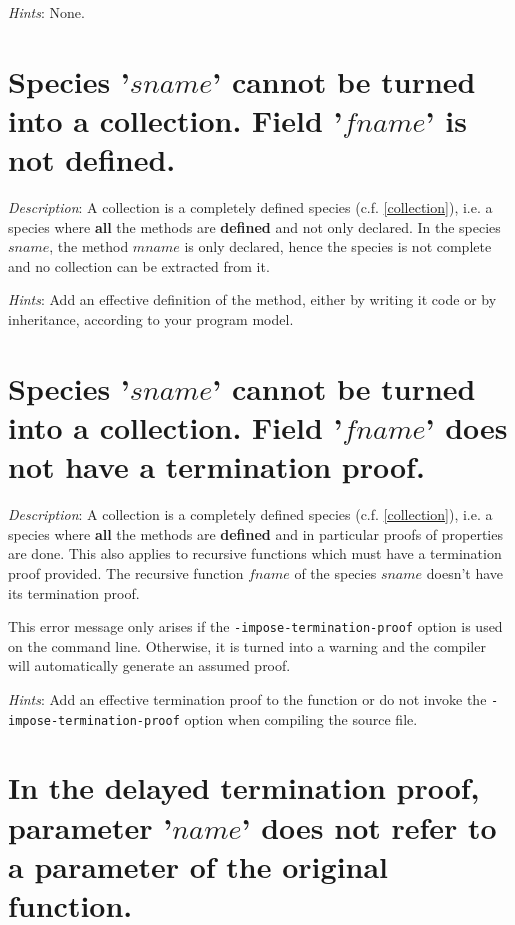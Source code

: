{\em Hints}: None.



\section*{Species '$sname$' cannot be turned into a collection. Field
  '$fname$' is not defined.}

{\em Description}: A collection is a completely defined species
(c.f. \ref{collection}), i.e. a species where {\bf all} the methods
are {\bf defined} and not only declared. In the species $sname$, the
method $mname$ is only declared, hence the species is not complete and
no collection can be extracted from it.

{\em Hints}: Add an effective definition of the method, either by
writing it code or by inheritance, according to your program model.



\section*{Species '$sname$' cannot be turned into a collection. Field
  '$fname$' does not have a termination proof.}

{\em Description}: A collection is a completely defined species
(c.f. \ref{collection}), i.e. a species where {\bf all} the methods
are {\bf defined} and in particular proofs of properties are
done. This also applies to recursive functions which must have a
termination proof provided. The recursive function $fname$ of the
species $sname$ doesn't have its termination proof.

This error message only arises if the {\tt -impose-termination-proof}
option is used on the command line. Otherwise, it is turned into a
warning and the compiler will automatically generate an assumed
proof.

{\em Hints}: Add an effective termination proof to the function or do
not invoke the {\tt -impose-termination-proof} option when compiling
the source file.



\section*{In the delayed termination proof, parameter '$name$' does
  not refer to a parameter of the original function.}

